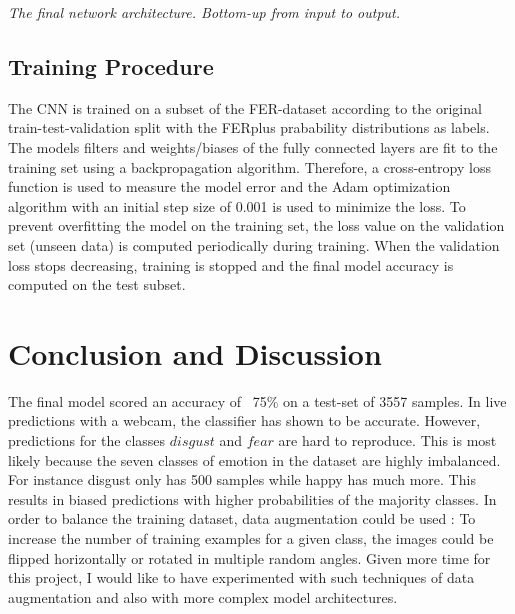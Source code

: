 \documentclass[twoside]{article}
\begin{document}
\begin{multicols}{2}
\begin{tabular}{|| c ||}
\end{tabular}

\medskip

\textit{The final network architecture. Bottom-up from input to output.}


\subsection{Training Procedure}
The CNN is trained on a subset of the FER-dataset according to the original train-test-validation split with the FERplus prabability distributions as labels. The models filters and weights/biases of the fully connected layers are fit to the training set using a backpropagation algorithm. Therefore, a cross-entropy loss function is used to measure the model error and the Adam optimization algorithm with an initial step size of 0.001 is used to minimize the loss. To prevent overfitting the model on the training set, the loss value on the validation set (unseen data) is computed periodically during training. When the validation loss stops decreasing, training is stopped and the final model accuracy is computed on the test subset.


\section{Conclusion and Discussion}

The final model scored an accuracy of ~75\% on a test-set of 3557 samples. In live predictions with a webcam, the classifier has shown to be accurate. However, predictions for the classes $disgust$ and $fear$ are hard to reproduce. This is most likely because the seven classes of emotion in the dataset are highly imbalanced. For instance disgust only has 500 samples while happy has much more. This results in biased predictions with higher probabilities of the majority classes. In order to balance the training dataset, data augmentation could be used \cite{krizhevsky12}: To increase the number of training examples for a given class, the images could be flipped horizontally or rotated in multiple random angles. Given more time for this project, I would like to have experimented with such techniques of data augmentation and also with  more complex model architectures.









\end{multicols}
\end{document}
